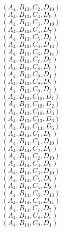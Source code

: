 \documentclass[14pt]{article}
\begin{document}
    $({A}_{4}, {B}_{13}, {C}_{2}, {D}_{10}) $ \\ 
    $({A}_{4}, {B}_{13}, {C}_{3}, {D}_{9}) $ \\ 
    $({A}_{4}, {B}_{13}, {C}_{3}, {D}_{10}) $ \\ 
    $({A}_{4}, {B}_{13}, {C}_{5}, {D}_{7}) $ \\ 
    $({A}_{4}, {B}_{13}, {C}_{5}, {D}_{8}) $ \\ 
    $({A}_{4}, {B}_{13}, {C}_{6}, {D}_{13}) $ \\ 
    $({A}_{4}, {B}_{13}, {C}_{6}, {D}_{14}) $ \\ 
    $({A}_{4}, {B}_{13}, {C}_{7}, {D}_{5}) $ \\ 
    $({A}_{4}, {B}_{13}, {C}_{8}, {D}_{5}) $ \\ 
    $({A}_{4}, {B}_{13}, {C}_{9}, {D}_{1}) $ \\ 
    $({A}_{4}, {B}_{13}, {C}_{9}, {D}_{2}) $ \\ 
    $({A}_{4}, {B}_{13}, {C}_{9}, {D}_{3}) $ \\ 
    $({A}_{4}, {B}_{13}, {C}_{10}, {D}_{1}) $ \\ 
    $({A}_{4}, {B}_{13}, {C}_{10}, {D}_{2}) $ \\ 
    $({A}_{4}, {B}_{13}, {C}_{10}, {D}_{3}) $ \\ 
    $({A}_{4}, {B}_{13}, {C}_{13}, {D}_{6}) $ \\ 
    $({A}_{4}, {B}_{13}, {C}_{14}, {D}_{6}) $ \\ 
    $({A}_{4}, {B}_{14}, {C}_{1}, {D}_{9}) $ \\ 
    $({A}_{4}, {B}_{14}, {C}_{1}, {D}_{10}) $ \\ 
    $({A}_{4}, {B}_{14}, {C}_{2}, {D}_{9}) $ \\ 
    $({A}_{4}, {B}_{14}, {C}_{2}, {D}_{10}) $ \\ 
    $({A}_{4}, {B}_{14}, {C}_{3}, {D}_{9}) $ \\ 
    $({A}_{4}, {B}_{14}, {C}_{3}, {D}_{10}) $ \\ 
    $({A}_{4}, {B}_{14}, {C}_{5}, {D}_{7}) $ \\ 
    $({A}_{4}, {B}_{14}, {C}_{5}, {D}_{8}) $ \\ 
    $({A}_{4}, {B}_{14}, {C}_{6}, {D}_{13}) $ \\ 
    $({A}_{4}, {B}_{14}, {C}_{6}, {D}_{14}) $ \\ 
    $({A}_{4}, {B}_{14}, {C}_{7}, {D}_{5}) $ \\ 
    $({A}_{4}, {B}_{14}, {C}_{8}, {D}_{5}) $ \\ 
    $({A}_{4}, {B}_{14}, {C}_{9}, {D}_{1}) $ \\ 
\end{document}
